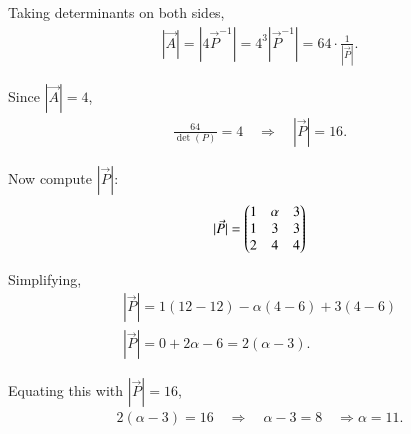 \documentclass[journal]{IEEEtran}
\begin{document}
Taking determinants on both sides,
\begin{align}
|\Vec{A}| = |4\Vec{P}^{-1}| = 4^3 |\Vec{P}^{-1}| = 64 \cdot \frac{1}{|\Vec{P}|}.
\end{align}

Since $|\Vec{A}| = 4$,
\begin{align}
\frac{64}{\det(P)} = 4 \quad \Rightarrow \quad |\Vec{P}| = 16.
\end{align}

Now compute $|\Vec{P}|$:
\begin{align}
|\Vec{P}| = \begin{pmatrix}1 & \alpha & 3 \\ 1 & 3 & 3 \\ 2 & 4 & 4\end{pmatrix}
\end{align}

Simplifying,
\begin{align}
|\Vec{P}| = 1(12 - 12) - \alpha(4 - 6) + 3(4 - 6) \\
|\Vec{P}| = 0 + 2\alpha - 6 = 2(\alpha - 3).
\end{align}

Equating this with $|\Vec{P}| = 16$,
\begin{align}
2(\alpha - 3) = 16 \quad \Rightarrow \quad \alpha - 3 = 8 \quad \Rightarrow \alpha = 11.
\end{align}
\end{document}
